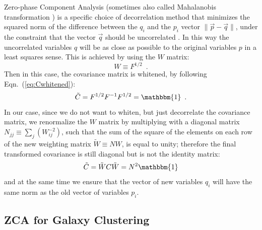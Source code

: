 Zero-phase Component Analysis (sometimes also called Mahalanobis transformation \cite{kessy_optimal_2015}) is a specific choice of decorrelation method that 
minimizes the squared norm of the difference between the $q_i$
and the $p_i$ vector $\|\vec{p}-\vec{q}\|$, under the constraint that the vector $\vec{q}$ should be uncorrelated \cite{kessy_optimal_2015}. 
In this way the uncorrelated variables $q$ will be as close 
as possible to the original variables $p$ in a least squares sense. 
This is achieved by using the $W$ matrix:
\begin{equation}
W \equiv F^{1/2} \,\,\, .
\end{equation}
Then in this case, the covariance matrix is whitened, by following Eqn.\ (\ref{eq:Cwhitened}):
\begin{equation}
\tilde{C} =F^{1/2}F^{-1}F^{1/2}=\mathbbm{1} \,\,\, .
\end{equation}
In our case, since we do not want to whiten, but just decorrelate the covariance matrix,
we renormalize the $W$ matrix by multiplying with a diagonal matrix $N_{jj}\equiv\sum_j(W_{ij}^{-2})$, such that the sum of the square of the 
elements on each row of the new weighting matrix 
$\tilde{W} \equiv N W$, is equal to unity; therefore the final
transformed covariance is still diagonal but is not the identity matrix: 
\begin{equation}
\tilde{C}=\tilde{W}C\tilde{W}=N^{2} \mathbbm{1} \label{eq:Ctilde-decor}
\end{equation}
and at the same time we ensure that 
the vector of new variables $q_i$ will have the same norm as the old vector of variables $p_i$.

\subsection{ZCA for Galaxy Clustering \label{subsub:ZCA-GC}}


